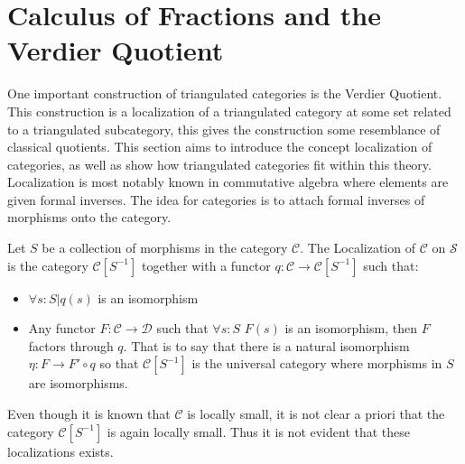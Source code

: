 \section{Calculus of Fractions and the Verdier Quotient}
    One important construction of triangulated categories is the Verdier Quotient. This construction is a localization of a triangulated category at some set related to a triangulated subcategory, this gives the construction some resemblance of classical quotients. This section aims to introduce the concept localization of categories, as well as show how triangulated categories fit within this theory. Localization is most notably known in commutative algebra where elements are given formal inverses. The idea for categories is to attach formal inverses of morphisms onto the category.
    \begin{definition}
        Let $S$ be a collection of morphisms in the category $\mathcal{C}$. The Localization of $\mathcal{C}$ on $\mathcal{S}$ is the category $\mathcal{C}[S^{-1}]$ together with a functor $q:\mathcal{C}\rightarrow \mathcal{C}[S^{-1}]$ such that:
        \begin{itemize}
            \item $\forall s:S|q(s)$ is an isomorphism
            \item Any functor $F:\mathcal{C}\rightarrow\mathcal{D}$ such that $\forall s:S$ $F(s)$ is an isomorphism, then $F$ factors through $q$. That is to say that there is a natural isomorphism $\eta : F\rightarrow F'\circ q$ so that $\mathcal{C}[S^{-1}]$ is the universal category where morphisms in $S$ are isomorphisms.
        \end{itemize}
        \begin{center}
        \end{center}
    \end{definition}

    \begin{remark}
        Even though it is known that $\mathcal{C}$ is locally small, it is not clear a priori that the category $\mathcal{C}[S^{-1}]$ is again locally small. Thus it is not evident that these localizations exists.
    \end{remark}

